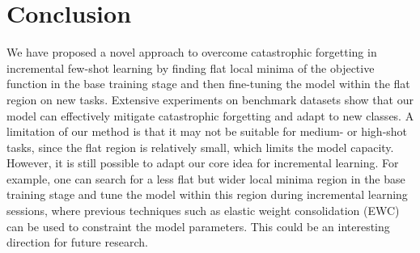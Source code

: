 \documentclass{article}
\begin{document}
\begin{table*}[t]
\renewcommand\arraystretch{1.0}
\caption{Study of the flat region bound $b$ for 5-way 5-shot incremental learning on CIFAR-100. The top 3 results in each row are in boldface.} 
\label{tab:bound}
\centering
{}
\end{table*} 




 \section{Conclusion}\label{sec:conclusion}
 We have proposed a novel approach to overcome catastrophic forgetting in incremental few-shot learning by finding flat local minima of the objective function in the base training stage and then fine-tuning the model within the flat region on new tasks. Extensive experiments on benchmark datasets show that our model can effectively mitigate catastrophic forgetting and adapt to new classes.
 A limitation of our method is that it may not be suitable for medium- or high-shot tasks, since the flat region is relatively small, which limits the model capacity. However, it is still possible to adapt our core idea for incremental learning. For example, one can search for a less flat but wider local minima region in the base training stage and tune the model within this region during incremental learning sessions, where previous techniques such as elastic weight consolidation (EWC)~\citep{kirkpatrick2017overcoming} can be used to constraint the model parameters. This could be an interesting direction for future research.
\end{document}

